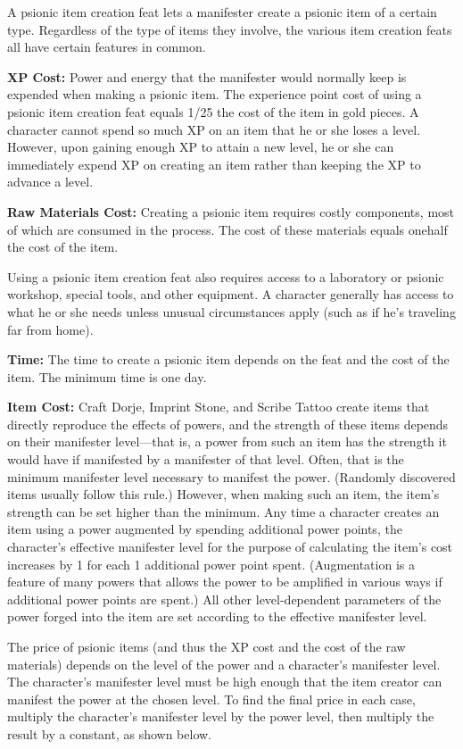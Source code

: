 A psionic item creation feat lets a manifester create a psionic item of a certain type. Regardless of the type of items they involve, the various item creation feats all have certain features in common.

\textbf{XP Cost:} Power and energy that the manifester would normally keep is expended when making a psionic item. The experience point cost of using a psionic item creation feat equals 1/25 the cost of the item in gold pieces. A character cannot spend so much XP on an item that he or she loses a level. However, upon gaining enough XP to attain a new level, he or she can immediately expend XP on creating an item rather than keeping the XP to advance a level.

\textbf{Raw Materials Cost:} Creating a psionic item requires costly components, most of which are consumed in the process. The cost of these materials equals onehalf the cost of the item.

Using a psionic item creation feat also requires access to a laboratory or psionic workshop, special tools, and other equipment. A character generally has access to what he or she needs unless unusual circumstances apply (such as if he's traveling far from home).

\textbf{Time:} The time to create a psionic item depends on the feat and the cost of the item. The minimum time is one day.

\textbf{Item Cost:} Craft Dorje, Imprint Stone, and Scribe Tattoo create items that directly reproduce the effects of powers, and the strength of these items depends on their manifester level---that is, a power from such an item has the strength it would have if manifested by a manifester of that level. Often, that is the minimum manifester level necessary to manifest the power. (Randomly discovered items usually follow this rule.) However, when making such an item, the item's strength can be set higher than the minimum. Any time a character creates an item using a power augmented by spending additional power points, the character's effective manifester level for the purpose of calculating the item's cost increases by 1 for each 1 additional power point spent. (Augmentation is a feature of many powers that allows the power to be amplified in various ways if additional power points are spent.) All other level-dependent parameters of the power forged into the item are set according to the effective manifester level.

The price of psionic items (and thus the XP cost and the cost of the raw materials) depends on the level of the power and a character's manifester level. The character's manifester level must be high enough that the item creator can manifest the power at the chosen level. To find the final price in each case, multiply the character's manifester level by the power level, then multiply the result by a constant, as shown below.

